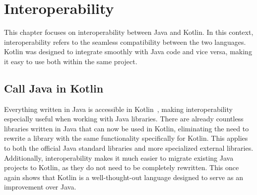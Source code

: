 \documentclass[a4paper,11pt]{article}
\begin{document}
\section{Interoperability}

This chapter focuses on interoperability between Java and Kotlin. In this context, interoperability refers to the seamless compatibility between the two languages. Kotlin was designed to integrate smoothly with Java code and vice versa, making it easy to use both within the same project.

\subsection{Call Java in Kotlin}
Everything written in Java is accessible in Kotlin~\cite{interop}, making interoperability especially useful when working with Java libraries. There are already countless libraries written in Java that can now be used in Kotlin, eliminating the need to rewrite a library with the same functionality specifically for Kotlin. This applies to both the official Java standard libraries and more specialized external libraries. Additionally, interoperability makes it much easier to migrate existing Java projects to Kotlin, as they do not need to be completely rewritten. This once again shows that Kotlin is a well-thought-out language designed to serve as an improvement over Java.
\end{document}
